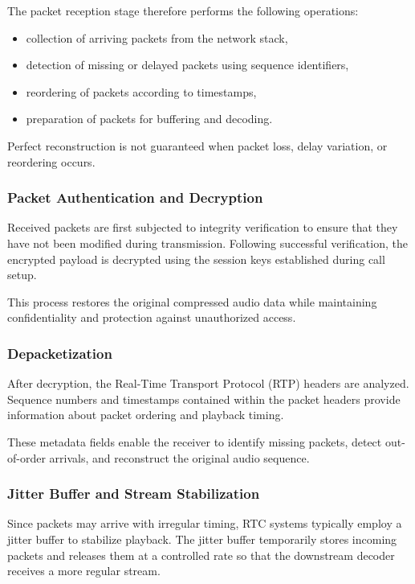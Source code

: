 The packet reception stage therefore performs the following operations:
\begin{itemize}
    \item collection of arriving packets from the network stack,
    \item detection of missing or delayed packets using sequence identifiers,
    \item reordering of packets according to timestamps,
    \item preparation of packets for buffering and decoding.
\end{itemize}

Perfect reconstruction is not guaranteed when packet loss, delay variation, or reordering occurs.

\subsubsection{Packet Authentication and Decryption}

Received packets are first subjected to integrity verification to ensure that they have not been modified during transmission. Following successful verification, the encrypted payload is decrypted using the session keys established during call setup.

This process restores the original compressed audio data while maintaining confidentiality and protection against unauthorized access.

\subsubsection{Depacketization}

After decryption, the Real-Time Transport Protocol (RTP) headers are analyzed. Sequence numbers and timestamps contained within the packet headers provide information about packet ordering and playback timing.

These metadata fields enable the receiver to identify missing packets, detect out-of-order arrivals, and reconstruct the original audio sequence.

\subsubsection{Jitter Buffer and Stream Stabilization}

Since packets may arrive with irregular timing, RTC systems typically employ a jitter buffer to stabilize playback. The jitter buffer temporarily stores incoming packets and releases them at a controlled rate so that the downstream decoder receives a more regular stream.


